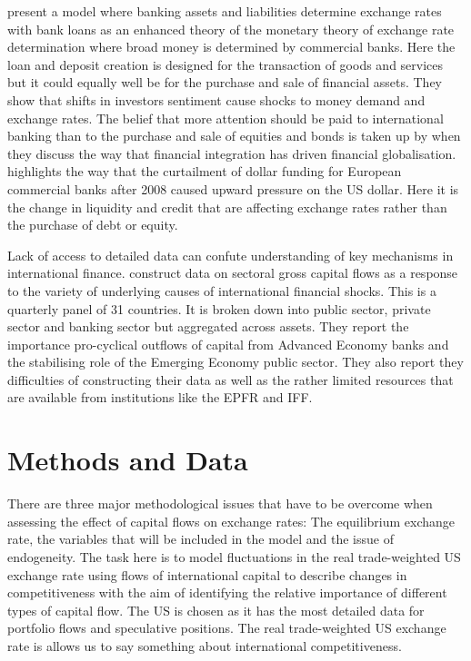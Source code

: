\documentclass[jrfm,article,accept,moreauthors,pdftex]{Definitions/mdpi}
\begin{document}
\citep{Cesa-Biachi2019} present a model where banking assets and liabilities determine exchange rates with bank loans as an enhanced theory of the monetary theory of exchange rate determination where broad money is determined by commercial banks.  Here the loan and deposit creation is designed for the transaction of goods and services but it could equally well be for the purchase and sale of financial assets.  They show that shifts in investors sentiment cause shocks to money demand and exchange rates. The belief that more attention should be paid to international banking than to the purchase and sale of equities and bonds is taken up by \citep{LaneMF2008} when they discuss the way that financial integration has driven financial globalisation. \citep{ObstfeldCA} highlights the way that the curtailment of dollar funding for European commercial banks after 2008 caused upward pressure on the US dollar. Here it is the change in liquidity and credit that are affecting exchange rates rather than the purchase of debt or equity. 

Lack of access to detailed data can confute understanding of key mechanisms in international finance. \citep{Avdjiev2014} construct data on sectoral gross capital flows as a response to the variety of underlying causes of international financial shocks. This is a quarterly panel of 31 countries. It is broken down into public sector, private sector and banking sector but aggregated across assets. They report the importance pro-cyclical outflows of capital from Advanced Economy banks and the stabilising role of the Emerging Economy public sector. They also report they difficulties of constructing their data as well as the rather limited resources that are available from institutions like the EPFR and IFF.  

\section{Methods and Data}\label{sec3}
There are three major methodological issues that have to be overcome when assessing the effect of capital flows on exchange rates: The equilibrium exchange rate, the variables that will be included in the model and the issue of endogeneity. The task here is to model fluctuations in the real trade-weighted US exchange rate using flows of international capital to describe changes in competitiveness with the aim of identifying the relative importance of different types of capital flow. The US is chosen as it has the most detailed data for portfolio flows and speculative positions. The real trade-weighted US exchange rate is allows us to say something about international competitiveness. 
\end{document}
